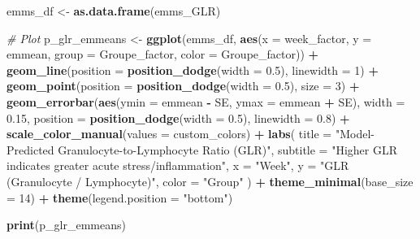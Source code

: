 \documentclass[
]{article}
\newenvironment{Shaded}{\begin{snugshade}}{\end{snugshade}}
\newcommand{\AttributeTok}[1]{\textcolor[rgb]{0.13,0.29,0.53}{#1}}
\newcommand{\CommentTok}[1]{\textcolor[rgb]{0.56,0.35,0.01}{\textit{#1}}}
\newcommand{\DecValTok}[1]{\textcolor[rgb]{0.00,0.00,0.81}{#1}}
\newcommand{\FloatTok}[1]{\textcolor[rgb]{0.00,0.00,0.81}{#1}}
\newcommand{\FunctionTok}[1]{\textcolor[rgb]{0.13,0.29,0.53}{\textbf{#1}}}
\newcommand{\NormalTok}[1]{#1}
\newcommand{\OtherTok}[1]{\textcolor[rgb]{0.56,0.35,0.01}{#1}}
\newcommand{\SpecialCharTok}[1]{\textcolor[rgb]{0.81,0.36,0.00}{\textbf{#1}}}
\newcommand{\StringTok}[1]{\textcolor[rgb]{0.31,0.60,0.02}{#1}}
\begin{document}
\begin{Shaded}
\begin{Highlighting}[]
\NormalTok{emms\_df }\OtherTok{\textless{}{-}} \FunctionTok{as.data.frame}\NormalTok{(emms\_GLR)}

\CommentTok{\# Plot}
\NormalTok{p\_glr\_emmeans }\OtherTok{\textless{}{-}} \FunctionTok{ggplot}\NormalTok{(emms\_df, }\FunctionTok{aes}\NormalTok{(}\AttributeTok{x =}\NormalTok{ week\_factor, }\AttributeTok{y =}\NormalTok{ emmean, }\AttributeTok{group =}\NormalTok{ Groupe\_factor, }\AttributeTok{color =}\NormalTok{ Groupe\_factor)) }\SpecialCharTok{+}
  \FunctionTok{geom\_line}\NormalTok{(}\AttributeTok{position =} \FunctionTok{position\_dodge}\NormalTok{(}\AttributeTok{width =} \FloatTok{0.5}\NormalTok{), }\AttributeTok{linewidth =} \DecValTok{1}\NormalTok{) }\SpecialCharTok{+}
  \FunctionTok{geom\_point}\NormalTok{(}\AttributeTok{position =} \FunctionTok{position\_dodge}\NormalTok{(}\AttributeTok{width =} \FloatTok{0.5}\NormalTok{), }\AttributeTok{size =} \DecValTok{3}\NormalTok{) }\SpecialCharTok{+}
  \FunctionTok{geom\_errorbar}\NormalTok{(}\FunctionTok{aes}\NormalTok{(}\AttributeTok{ymin =}\NormalTok{ emmean }\SpecialCharTok{{-}}\NormalTok{ SE, }\AttributeTok{ymax =}\NormalTok{ emmean }\SpecialCharTok{+}\NormalTok{ SE),}
                \AttributeTok{width =} \FloatTok{0.15}\NormalTok{, }\AttributeTok{position =} \FunctionTok{position\_dodge}\NormalTok{(}\AttributeTok{width =} \FloatTok{0.5}\NormalTok{), }\AttributeTok{linewidth =} \FloatTok{0.8}\NormalTok{) }\SpecialCharTok{+}
  \FunctionTok{scale\_color\_manual}\NormalTok{(}\AttributeTok{values =}\NormalTok{ custom\_colors) }\SpecialCharTok{+}
  \FunctionTok{labs}\NormalTok{(}
    \AttributeTok{title =} \StringTok{"Model{-}Predicted Granulocyte{-}to{-}Lymphocyte Ratio (GLR)"}\NormalTok{,}
    \AttributeTok{subtitle =} \StringTok{"Higher GLR indicates greater acute stress/inflammation"}\NormalTok{,}
    \AttributeTok{x =} \StringTok{"Week"}\NormalTok{,}
    \AttributeTok{y =} \StringTok{"GLR (Granulocyte / Lymphocyte)"}\NormalTok{,}
    \AttributeTok{color =} \StringTok{"Group"}
\NormalTok{  ) }\SpecialCharTok{+}
  \FunctionTok{theme\_minimal}\NormalTok{(}\AttributeTok{base\_size =} \DecValTok{14}\NormalTok{) }\SpecialCharTok{+}
  \FunctionTok{theme}\NormalTok{(}\AttributeTok{legend.position =} \StringTok{"bottom"}\NormalTok{)}

\FunctionTok{print}\NormalTok{(p\_glr\_emmeans)}
\end{Highlighting}
\end{Shaded}
\end{document}
